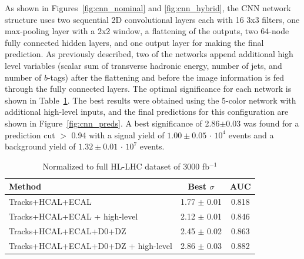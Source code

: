 
As shown in Figures~\ref{fig:cnn_nominal} and \ref{fig:cnn_hybrid}, the CNN network structure uses two sequential 2D convolutional layers each with 16 3x3 filters, one max-pooling layer with a 2x2 window, a flattening of the outputs, two 64-node fully connected hidden layers, and one output layer for making the final prediction. As previously described, two of the networks append additional high level variables (scalar sum of transverse hadronic energy, number of jets, and number of $b$-tags) after the flattening and before the image information is fed through the fully connected layers. The optimal significance for each network is shown in Table~\ref{tab:cnnResults}. The best results were obtained using the 5-color network with additional high-level inputs, and the final predictions for this configuration are shown in Figure~\ref{fig:cnn_preds}. A best significance of 2.86$\pm$0.03 was found for a prediction cut $>$ 0.94 with a signal yield of $1.00\pm 0.05$ $\cdot$ $10^4$ events and a background yield of $1.32\pm 0.01$ $\cdot$ $10^7$ events.

\begin{table}[h!]
\label{tab:cnnResults}
  \begin{center}
    \begin{tabular}{|l|c|c|} %
      \hline\hline
      \textbf{Method} & Best $\sigma$ & AUC \\
      \hline
      Tracks+HCAL+ECAL & 1.77 $\pm$ 0.01 & 0.818 \\
      Tracks+HCAL+ECAL + high-level & 2.12 $\pm$ 0.01 & 0.846 \\
      Tracks+HCAL+ECAL+D0+DZ & 2.45 $\pm$ 0.02 & 0.863 \\
      Tracks+HCAL+ECAL+D0+DZ + high-level & 2.86 $\pm$ 0.03 & 0.882 \\

      \hline\hline
    \end{tabular}
    \caption{Normalized to full HL-LHC dataset of 3000 fb$^{-1}$}
  \end{center}
\end{table}


